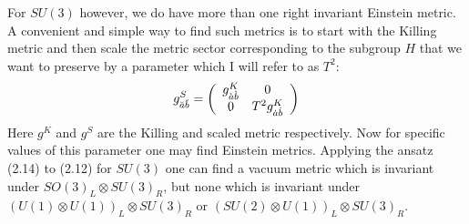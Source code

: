 \documentclass[a4paper,12pt]{article}
\begin{document}
For $SU(3)$ however, we do have more than one right invariant Einstein metric. A convenient and simple way to find such metrics is to start with the Killing metric and then scale the metric sector corresponding to the subgroup $H$ that we want to preserve by a parameter which I will refer to as $T^2$:
\begin{equation}
g^S_{\breve{a}\breve{b}}=\left( \begin{array}{cc}
g^K_{\grave{a}\grave{b}} & 0\\
0& T^2g^K_{\dot{a}\dot{b}}
\end{array} \right)
\end{equation}
Here $g^K$ and $g^S$ are the Killing and scaled metric respectively. Now for specific values of this parameter one may  find Einstein metrics. Applying the ansatz (2.14) to (2.12) for $SU(3)$ one can find a vacuum metric  which is invariant under $SO(3)_L\otimes SU(3)_R$,  but none which is invariant under  $(U(1)\otimes U(1))_L\otimes SU(3)_R$ or  $(SU(2)\otimes U(1))_L\otimes SU(3)_R$. 
\end{document}
